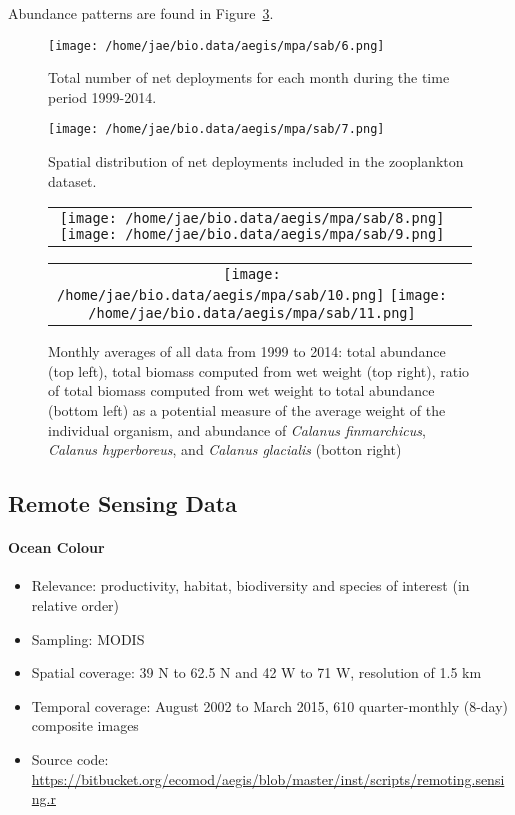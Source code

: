 \documentclass[letterpaper,portrait,11pt]{scrartcl}
\numberwithin{equation}{section}    %
\numberwithin{figure}{section}    %
\numberwithin{table}{section}       %
\begin{document}
Abundance patterns are found in Figure~\ref{fig:AZMPBiomassMonthly}.

\begin{figure}[h]
  \centering
  \texttt{[image: /home/jae/bio.data/aegis/mpa/sab/6.png]}
  \caption{Total number of net deployments for each month during the time period 1999-2014.}
  \label{fig:AZMPdeploymentsMonthly}
\end{figure}

\begin{figure}[h]
  \centering
  \texttt{[image: /home/jae/bio.data/aegis/mpa/sab/7.png]}
  \caption{Spatial distribution of net deployments included in the zooplankton dataset. }
  \label{fig:AZMPdeploymentsMonthlyMap}
\end{figure}

\begin{figure}[h]
  \centering
  \begin{tabular}{cc}
      \texttt{[image: /home/jae/bio.data/aegis/mpa/sab/8.png]}
      \texttt{[image: /home/jae/bio.data/aegis/mpa/sab/9.png]}
  \end{tabular}
  \begin{tabular}{cc}
      \texttt{[image: /home/jae/bio.data/aegis/mpa/sab/10.png]}
      \texttt{[image: /home/jae/bio.data/aegis/mpa/sab/11.png]}
  \end{tabular}
  \caption{Monthly averages of all data from 1999 to 2014: total abundance (top left), total biomass computed from wet weight (top right), ratio of total biomass computed from wet weight  to total abundance (bottom left) as a potential measure of the average weight of the individual organism, and abundance of \textit{Calanus finmarchicus}, \textit{Calanus hyperboreus}, and \textit{Calanus glacialis} (botton right) }
  \label{fig:AZMPBiomassMonthly}
\end{figure}

\afterpage{\clearpage}
\subsection{Remote Sensing Data} 

\paragraph{Ocean Colour}

\begin{itemize}
  \item Relevance:  productivity, habitat, biodiversity and species of interest (in relative order) 
  \item Sampling:  MODIS
  \item Spatial coverage: 39 N to 62.5 N and 42 W to 71 W, resolution of 1.5 km
  \item Temporal coverage: August 2002 to March 2015, 610 quarter-monthly (8-day) composite  images
  \item Source code: \url{https://bitbucket.org/ecomod/aegis/blob/master/inst/scripts/remoting.sensing.r}
\end{itemize}
\end{document}
